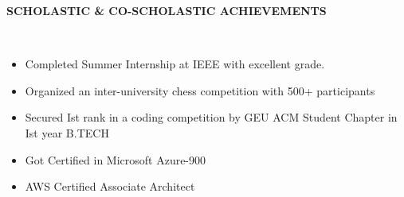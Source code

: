 \documentclass[a4paper,10pt]{article}
\newcommand{\lsep}{-0.5cm}
\newcommand{\resheading}[1]{{\small \colorbox{mygrey}{\begin{minipage}{0.975\textwidth}{\textbf{#1 \vphantom{p\^{E}}}}\end{minipage}}}}
\begin{document}
\resheading{\textbf{SCHOLASTIC \& CO-SCHOLASTIC ACHIEVEMENTS} }\\[\lsep]
\begin{itemize}[itemsep=0.01mm, parsep=2pt]
\item \noindent Completed Summer Internship at IEEE with excellent grade.
\item \noindent Organized an inter-university chess competition with 500+ participants
\item \noindent Secured Ist rank in a coding competition by GEU ACM Student Chapter in Ist year B.TECH
\item \noindent Got Certified in Microsoft Azure-900
\item \noindent AWS Certified Associate Architect
\end{itemize}
\end{document}
